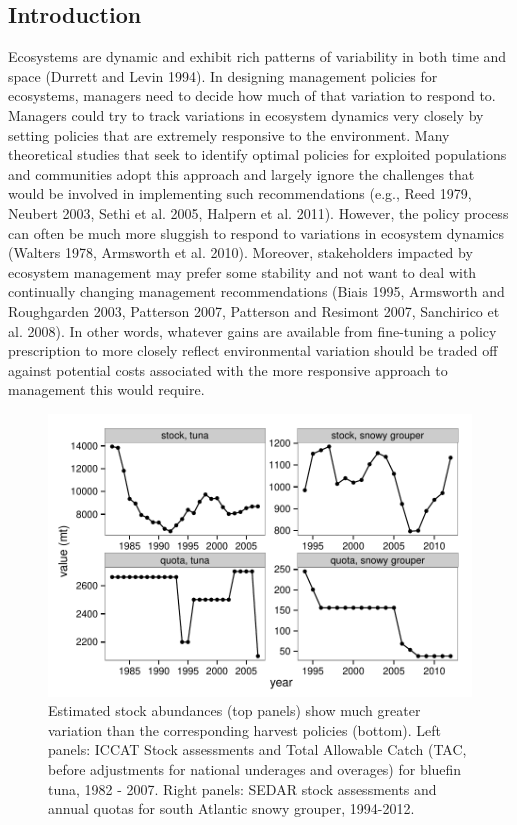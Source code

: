 \documentclass[review,12pt,author-year,titlepage]{components/elsarticle} %
\makeatletter
\def\maxwidth{\ifdim\Gin@nat@width>\linewidth\linewidth
\else\Gin@nat@width\fi}
\let\Oldincludegraphics\includegraphics
\renewcommand{\includegraphics}[1]{\Oldincludegraphics[width=\maxwidth]{#1}}
\makeatother
\begin{document}
\begin{flushleft}
\section{Introduction}\label{introduction}

Ecosystems are dynamic and exhibit rich patterns of variability in both
time and space (Durrett and Levin 1994). In designing management
policies for ecosystems, managers need to decide how much of that
variation to respond to. Managers could try to track variations in
ecosystem dynamics very closely by setting policies that are extremely
responsive to the environment. Many theoretical studies that seek to
identify optimal policies for exploited populations and communities
adopt this approach and largely ignore the challenges that would be
involved in implementing such recommendations (e.g., Reed 1979, Neubert
2003, Sethi et al. 2005, Halpern et al. 2011). However, the policy
process can often be much more sluggish to respond to variations in
ecosystem dynamics (Walters 1978, Armsworth et al. 2010). Moreover,
stakeholders impacted by ecosystem management may prefer some stability
and not want to deal with continually changing management
recommendations (Biais 1995, Armsworth and Roughgarden 2003, Patterson
2007, Patterson and Resimont 2007, Sanchirico et al. 2008). In other
words, whatever gains are available from fine-tuning a policy
prescription to more closely reflect environmental variation should be
traded off against potential costs associated with the more responsive
approach to management this would require.

\begin{figure}[htbp]
\centering
\includegraphics{components/figure/manuscript-Figure_1-1.pdf}
\caption{Estimated stock abundances (top panels) show much greater
variation than the corresponding harvest policies (bottom). Left panels:
ICCAT Stock assessments and Total Allowable Catch (TAC, before
adjustments for national underages and overages) for bluefin tuna, 1982
- 2007. Right panels: SEDAR stock assessments and annual quotas for
south Atlantic snowy grouper, 1994-2012.}
\end{figure}


\end{flushleft}
\end{document}
